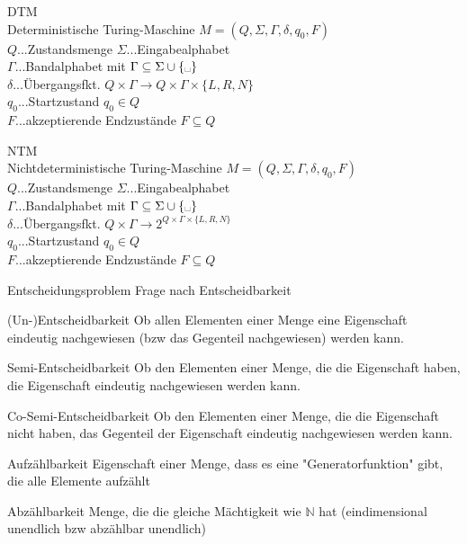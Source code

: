 \documentclass[a7paper,print,grid=both]{kartei}
\newcommand{\blank}{\text{\textvisiblespace}}
\begin{document}
\begin{karte}{DTM\\Deterministische Turing-Maschine}
$M=(Q,\Sigma,\Gamma,\delta,q_0,F)$\\$Q$...Zustandsmenge $\Sigma$...Eingabealphabet\\$\Gamma$...Bandalphabet mit $\Gamma\subseteq\Sigma\cup\{\blank\}$\\$\delta$...Übergangsfkt. $Q\times\Gamma\rightarrow Q\times\Gamma\times\{L,R,N\}$\\$q_0$...Startzustand $q_0\in Q$\\$F$...akzeptierende Endzustände $F \subseteq Q$
\end{karte}
\begin{karte}{NTM\\Nichtdeterministische Turing-Maschine}
$M=(Q,\Sigma,\Gamma,\delta,q_0,F)$\\$Q$...Zustandsmenge $\Sigma$...Eingabealphabet\\$\Gamma$...Bandalphabet mit $\Gamma\subseteq\Sigma\cup\{\blank\}$\\$\delta$...Übergangsfkt. $Q\times\Gamma\rightarrow 2^{Q\times\Gamma\times\{L,R,N\}}$\\$q_0$...Startzustand $q_0\in Q$\\$F$...akzeptierende Endzustände $F \subseteq Q$
\end{karte}
\begin{karte}{Entscheidungsproblem}
Frage nach Entscheidbarkeit
\end{karte}
\begin{karte}{(Un-)Entscheidbarkeit}
Ob allen Elementen einer Menge eine Eigenschaft eindeutig nachgewiesen (bzw das Gegenteil nachgewiesen) werden kann.
\end{karte}
\begin{karte}{Semi-Entscheidbarkeit}
Ob den Elementen einer Menge, die die Eigenschaft haben, die Eigenschaft eindeutig nachgewiesen werden kann.
\end{karte}
\begin{karte}{Co-Semi-Entscheidbarkeit}
Ob den Elementen einer Menge, die die Eigenschaft nicht haben, das Gegenteil der Eigenschaft eindeutig nachgewiesen werden kann.
\end{karte}
\begin{karte}{Aufzählbarkeit}
Eigenschaft einer Menge, dass es eine "Generatorfunktion" gibt, die alle Elemente aufzählt
\end{karte}
\begin{karte}{Abzählbarkeit}
Menge, die die gleiche Mächtigkeit wie $\mathbb{N}$ hat (eindimensional unendlich bzw abzählbar unendlich)
\end{karte}
\end{document}
